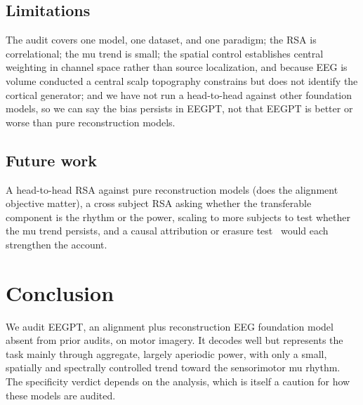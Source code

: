 \documentclass[journal]{IEEEtran}
\begin{document}
\subsection{Limitations}
The audit covers one model, one dataset, and one paradigm; the RSA is
correlational; the mu trend is small; the spatial control establishes central
weighting in channel space rather than source localization, and because EEG is
volume conducted a central scalp topography constrains but does not identify the
cortical generator; and we have not run a head-to-head against other foundation
models, so we can say the bias persists in EEGPT, not that EEGPT is better or
worse than pure reconstruction models.

\subsection{Future work}
A head-to-head RSA against pure reconstruction models (does the alignment
objective matter), a cross subject RSA asking whether the transferable component
is the rhythm or the power, scaling to more subjects to test whether the mu
trend persists, and a causal attribution or erasure test~\cite{shama2026prism}
would each strengthen the account.

\section{Conclusion}
We audit EEGPT, an alignment plus reconstruction EEG foundation model absent
from prior audits, on motor imagery. It decodes well but represents the task
mainly through aggregate, largely aperiodic power, with only a small, spatially
and spectrally controlled trend toward the sensorimotor mu rhythm. The
specificity verdict depends on the analysis, which is itself a caution for how
these models are audited.



\end{document}

